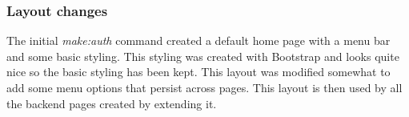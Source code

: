 \subsubsection{Layout changes}
The initial \textit{make:auth} command created a default home page with a menu bar and some basic styling. This styling was created with Bootstrap\cite{bootstrap} and looks quite nice so the basic styling has been kept. This layout was modified somewhat to add some menu options that persist across pages. This layout is then used by all the backend pages created by extending it.
\newpage
